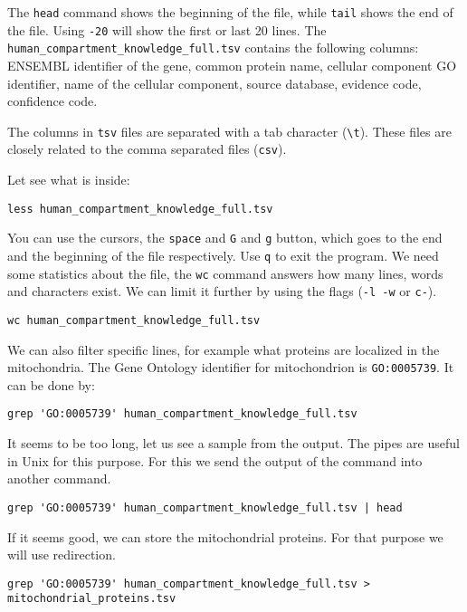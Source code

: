 \documentclass{article}\usepackage[]{graphicx}\usepackage[usenames,dvipsnames]{color}
\begin{document}
The \verb+head+ command shows the beginning of the file, while \verb+tail+ shows the end of the file. Using \verb+-20+ will show the first or last 20 lines. The \verb+human_compartment_knowledge_full.tsv+ contains the following columns: ENSEMBL identifier of the gene, common protein name, cellular component GO identifier, name of the cellular component, source database, evidence code, confidence code.

The columns in \verb+tsv+ files are separated with a tab character (\verb+\t+). These files are closely related to the comma separated files (\verb+csv+).

Let see what is inside:

\begin{verbatim}
less human_compartment_knowledge_full.tsv
\end{verbatim}

You can use the cursors, the \verb+space+ and \verb+G+ and \verb+g+ button, which goes to the end and the beginning of the file respectively. Use \verb+q+ to exit the program. We need some statistics about the file, the \verb+wc+ command answers how many lines, words and characters exist. We can limit it further by using the flags (\verb+-l -w+ or \verb+c-+).

\begin{verbatim}
wc human_compartment_knowledge_full.tsv
\end{verbatim}

We can also filter specific lines, for example what proteins are localized in the mitochondria. The Gene Ontology identifier for mitochondrion is \verb+GO:0005739+. It can be done by:

\begin{verbatim}
grep 'GO:0005739' human_compartment_knowledge_full.tsv
\end{verbatim}

It seems to be too long, let us see a sample from the output. The pipes are useful in Unix for this purpose. For this we send the output of the command into another command.

\begin{verbatim}
grep 'GO:0005739' human_compartment_knowledge_full.tsv | head
\end{verbatim}

If it seems good, we can store the mitochondrial proteins. For that purpose we will use redirection.

\begin{verbatim}
grep 'GO:0005739' human_compartment_knowledge_full.tsv > mitochondrial_proteins.tsv
\end{verbatim}
\end{document}

